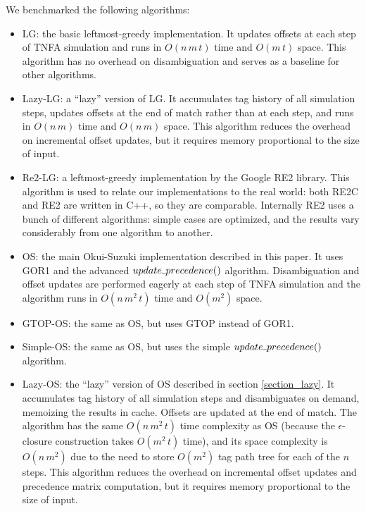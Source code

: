 \documentclass[AMA,STIX1COL]{WileyNJD-v2}
\newcommand{\Xund}{\rule{.4em}{.4pt}}
\begin{document}
We benchmarked the following algorithms:
\begin{itemize}[itemsep=0.2em, topsep=0.5em]
\item LG: the basic leftmost-greedy implementation.
    It updates offsets at each step of TNFA simulation
    and runs in $O(n \, m \, t)$ time and $O(m \, t)$ space.
    This algorithm has no overhead on disambiguation
    and serves as a baseline for other algorithms.

\item Lazy-LG: a ``lazy'' version of LG.
    It accumulates tag history of all simulation steps,
    updates offsets at the end of match rather than at each step,
    and runs in $O(n \, m)$ time and $O(n \, m)$ space.
    This algorithm reduces the overhead on incremental offset updates,
    but it requires memory proportional to the size of input.

\item Re2-LG: a leftmost-greedy implementation by the Google RE2 library.
    This algorithm is used to relate our implementations to the real world:
    both RE2C and RE2 are written in C++, so they are comparable.
    Internally RE2 uses a bunch of different algorithms:
    simple cases are optimized,
    and the results vary considerably from one algorithm to another.

\item OS: the main Okui-Suzuki implementation described in this paper.
    It uses GOR1 and the advanced $update \Xund precedence()$ algorithm.
    Disambiguation and offset updates are performed eagerly at each step of TNFA simulation
    and the algorithm runs in $O(n \, m^2 \, t)$ time and $O(m^2)$ space.

\item GTOP-OS: the same as OS, but uses GTOP instead of GOR1.

\item Simple-OS: the same as OS, but uses the simple $update \Xund precedence()$ algorithm.

\item Lazy-OS: the ``lazy'' version of OS described in section \ref{section_lazy}.
    It accumulates tag history of all simulation steps and
    disambiguates on demand, memoizing the results in cache.
    Offsets are updated at the end of match.
    The algorithm has the same $O(n \, m^2 \, t)$ time complexity as OS (because the $\epsilon$-closure construction takes $O(m^2 \, t)$ time),
    and its space complexity is $O(n \, m^2)$ due to the need to store $O(m^2)$ tag path tree for each of the $n$ steps.
    This algorithm reduces the overhead on incremental offset updates and precedence matrix computation,
    but it requires memory proportional to the size of input.


\end{itemize}
\end{document}
